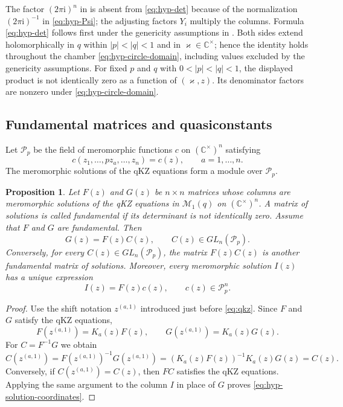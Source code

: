 \documentclass[12pt]{amsart}
\newtheorem{prop}[thm]{Proposition}
\theoremstyle{definition}
\numberwithin{equation}{section}
\theoremstyle{definition}
\let\mc\mathcal
\def\C{{\mathbb C}}
\def\beq{\begin{equation}}
\def\eeq{\end{equation}}
\begin{document}
The factor $(2\pi\mathrm{i})^n$ in \cite[Theorem~5.9]{TV97} is absent from
\eqref{eq:hyp-det} because of the normalization
$(2\pi\mathrm{i})^{-1}$ in \eqref{eq:hyp-Psi}; the adjusting factors
$Y_i$ multiply the columns.  Formula \eqref{eq:hyp-det} follows
first under the genericity assumptions in \cite[Theorem~5.9]{TV97}.
Both sides extend holomorphically in $q$ within
$|p|<|q|<1$ and in $\varkappa\in\C^\times$; hence the identity
holds throughout the chamber \eqref{eq:hyp-circle-domain},
including values excluded by the genericity assumptions.
For fixed $p$ and $q$ with $0<|p|<|q|<1$, the displayed product is not identically zero as a function of
$(\varkappa,z)$.  Its denominator factors are nonzero under
\eqref{eq:hyp-circle-domain}.

\subsection{Fundamental matrices and quasiconstants}

Let $\mc P_p$ be the field of meromorphic functions
$c$ on $(\C^\times)^n$ satisfying
\beq\label{eq:hyp-quasiconstants}
 c(z_1,\ldots,pz_a,\ldots,z_n)=c(z),
 \qquad a=1,\ldots,n.
\eeq
The meromorphic solutions of the qKZ equations form a module over
$\mc P_p$.

\begin{prop}\label{prop:hyp-fundamental}
Let $F(z)$ and $G(z)$ be $n\times n$ matrices whose columns are
meromorphic solutions of the qKZ equations in $\mc M_1(q)$
on $(\C^\times)^n$.  A matrix of solutions is called
\emph{fundamental} if its determinant is not identically zero.
Assume that $F$ and $G$ are fundamental.
Then
\beq\label{eq:hyp-transition}
 G(z)=F(z)C(z),\qquad C(z)\in GL_n(\mc P_p).
\eeq
Conversely, for every $C(z)\in GL_n(\mc P_p)$, the matrix
$F(z)C(z)$ is another fundamental matrix of solutions.
Moreover, every meromorphic solution $I(z)$ has a unique expression
\beq\label{eq:hyp-solution-coordinates}
 I(z)=F(z)c(z),\qquad c(z)\in\mc P_p^n.
\eeq
\end{prop}

\begin{proof}
Use the shift notation $z^{(a,1)}$ introduced just before \eqref{eq:qkz}.
Since $F$ and $G$ satisfy the qKZ equations,
\[
 F(z^{(a,1)})=K_a(z)F(z),\qquad
 G(z^{(a,1)})=K_a(z)G(z).
\]
For $C=F^{-1}G$ we obtain
\[
 C(z^{(a,1)})=F(z^{(a,1)})^{-1}G(z^{(a,1)})
   =(K_a(z)F(z))^{-1}K_a(z)G(z)=C(z).
\]
Conversely, if $C(z^{(a,1)})=C(z)$, then $FC$ satisfies the qKZ
equations. Applying the same argument to the column $I$ in place
of $G$ proves \eqref{eq:hyp-solution-coordinates}.
\end{proof}
\end{document}
